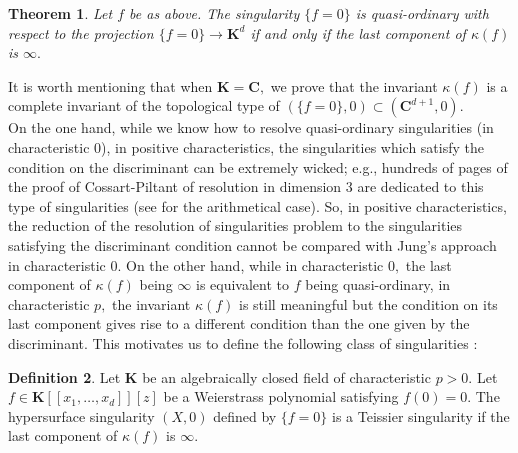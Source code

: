 \documentclass[11pt, a4paper]{amsart}
\numberwithin{equation}{section}
\theoremstyle{plain}
\newtheorem{Thm}{Theorem}[section]
\theoremstyle{definition}
\newtheorem{Def}[Thm]{Definition}
\theoremstyle{remark}
\newcommand{\0}{{\boldsymbol 0}}
\begin{document}
\begin{Thm}Let $f$ be as above. The singularity $\{f=0\}$ is quasi-ordinary with respect to the projection $\{f=0\}\longrightarrow\textbf{K}^d$ if and only if the last component of  $\kappa(f)$ is $\infty.$ 
\end{Thm}

It is worth mentioning that when $\textbf{K}=\textbf{C},$ we prove that the invariant $\kappa(f)$ is a complete invariant of the topological type of $(\{f=0\},0)\subset (\textbf{C}^{d+1},0).$\\  
On the one hand, while we know how to resolve quasi-ordinary singularities (in characteristic 0), in positive characteristics, the singularities which satisfy the condition on the discriminant can be extremely wicked; e.g., hundreds of pages  of the proof of Cossart-Piltant of resolution in dimension $3$ are dedicated to this type of singularities (see \cite{CParithm} for the arithmetical case). So, in positive characteristics, the reduction of the resolution of singularities problem to the singularities satisfying the discriminant condition cannot be compared with Jung's approach in characteristic $0.$ On the other hand, while in characteristic $0,$ the last component of $\kappa(f)$ being $\infty$ is equivalent to $f$ being quasi-ordinary, in  characteristic $p,$ the invariant $\kappa(f)$ is still meaningful but  the condition on its last component gives rise to a different condition than the one given by the discriminant. 
This motivates us to define the following class of singularities \cite{MS1}:\\

\begin{Def}Let  $\textbf{K}$ be an algebraically closed field of characteristic $p>0.$ Let $f\in \textbf{K}[[x_1,\ldots,x_d]][z]$ be a Weierstrass polynomial satisfying $f(0)=0.$ The hypersurface singularity $(X,0)$ defined by $\{f=0\}$ is a Teissier singularity if the last component of $\kappa(f)$ is $\infty.$
\end{Def}
\end{document}
